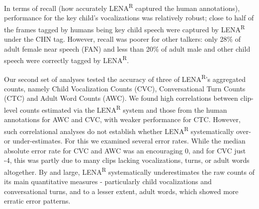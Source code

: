 \documentclass[english,table,man,floatsintext]{apa6}
\begin{document}
In terms of recall (how accurately LENA\textsuperscript{R} captured the human annotations), performance for the key child's vocalizations was relatively robust; close to half of the frames tagged by humans being key child speech were captured by LENA\textsuperscript{R} under the CHN tag. However, recall was poorer for other talkers: only 28\% of adult female near speech (FAN) and less than 20\% of adult male and other child speech were correctly tagged by LENA\textsuperscript{R}.

Our second set of analyses tested the accuracy of three of LENA\textsuperscript{R}'s aggregated counts, namely Child Vocalization Counts (CVC), Conversational Turn Counts (CTC) and Adult Word Counts (AWC). We found high correlations between clip-level counts estimated via the LENA\textsuperscript{R} system and those from the human annotations for AWC and CVC, with weaker performance for CTC. However, such correlational analyses do not establish whether LENA\textsuperscript{R} systematically over- or under-estimates. For this we examined several error rates. While the median absolute error rate for CVC and AWC was an encouraging 0, and for CVC just -4, this was partly due to many clips lacking vocalizations, turns, or adult words altogether. By and large, LENA\textsuperscript{R} systematically underestimates the raw counts of its main quantitative measures - particularly child vocalizations and conversational turns, and to a lesser extent, adult words, which showed more erratic error patterns.
\end{document}
